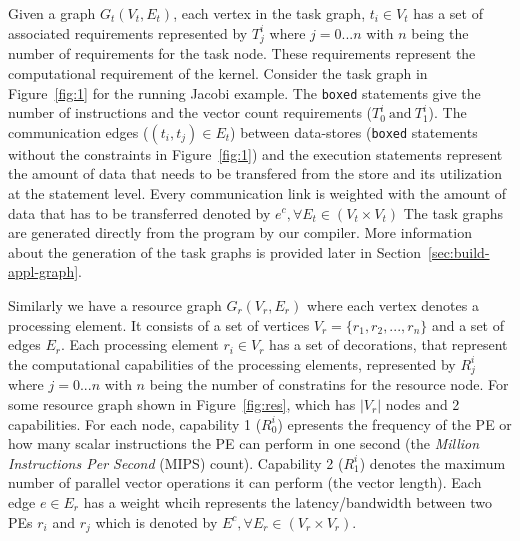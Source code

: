 \documentclass[10pt, conference, compsocconf]{IEEEtran}
\begin{document}
Given a graph $G_t(V_t, E_t)$, each vertex in the task graph, $t_i \in
V_t$ has a set of associated requirements represented by $T^{i}_{j}$
where $j=0...n$ with $n$ being the number of requirements for the task
node. These requirements represent the computational requirement of the
kernel. Consider the task graph in Figure~\ref{fig:1} for the running
Jacobi example. The \texttt{boxed} statements give the number of
instructions and the vector count requirements ($T^i_0\ \mathrm{and}\
T^i_1$). The communication edges ($(t_i, t_j) \in E_t$) between
data-stores (\texttt{boxed} statements without the constraints in
Figure~\ref{fig:1}) and the execution statements represent the amount of
data that needs to be transfered from the store and its utilization at
the statement level. Every communication link is weighted with the
amount of data that has to be transferred denoted by $e^c, \forall E_t
\in (V_t \times V_t)$ The task graphs are generated directly from the
program by our compiler. More information about the generation of the
task graphs is provided later in Section~\ref{sec:build-appl-graph}.


Similarly we have a resource graph $G_r(V_r, E_r)$ where each vertex
denotes a processing element. It consists of a set of vertices $V_r =
\{r_1, r_2, ... , r_n\}$ and a set of edges $E_r$. Each processing
element $r_i \in V_r$ has a set of decorations, that represent the
computational capabilities of the processing elements, represented by
$R^{i}_{j}$ where $j=0...n$ with $n$ being the number of constratins for
the resource node. For some resource graph shown in
Figure~\ref{fig:res}, which has $|V_r|$ nodes and 2 capabilities. For
each node, capability 1 ($R^i_0$) epresents the frequency of the PE or
how many scalar instructions the PE can perform in one second (the
\textit{Million Instructions Per Second} (MIPS) count). Capability 2
($R^i_1$) denotes the maximum number of parallel vector operations it
can perform (the vector length). Each edge $e \in E_r$ has a weight
whcih represents the latency/bandwidth between two PEs $r_i$ and $r_j$
which is denoted by $E^c, \forall E_r \in (V_r \times V_r)$.

\end{document}
